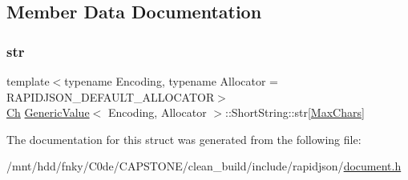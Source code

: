 \subsection{Member Data Documentation}
\mbox{\label{structGenericValue_1_1ShortString_a444e24523d4cc33830d18a2cfcfd333b}} 
\subsubsection{\texorpdfstring{str}{str}}
{\footnotesize\ttfamily template$<$typename Encoding, typename Allocator = R\+A\+P\+I\+D\+J\+S\+O\+N\+\_\+\+D\+E\+F\+A\+U\+L\+T\+\_\+\+A\+L\+L\+O\+C\+A\+T\+OR$>$ \\
\hyperlink{classGenericValue_ade0e0ce64ccd5d852da57a35e720bafb}{Ch} \hyperlink{classGenericValue}{Generic\+Value}$<$ Encoding, Allocator $>$\+::Short\+String\+::str\mbox{[}\hyperlink{structGenericValue_1_1ShortString_a04dd81c10335aeb7163fde8fbf5fb383a6b29cffcea816906d271656a958bc0c7}{Max\+Chars}\mbox{]}}



The documentation for this struct was generated from the following file\+:\begin{DoxyCompactItemize}
\item 
/mnt/hdd/fnky/\+C0de/\+C\+A\+P\+S\+T\+O\+N\+E/clean\+\_\+build/include/rapidjson/\hyperlink{document_8h}{document.\+h}\end{DoxyCompactItemize}

